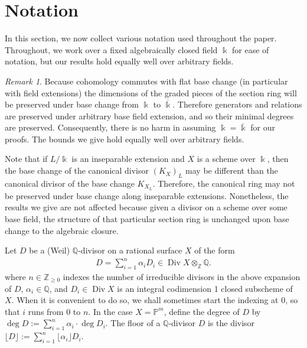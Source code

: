 \documentclass{amsart}
\theoremstyle{plain}
\theoremstyle{definition}
\theoremstyle{remark}
\newtheorem{rem}[thm]{Remark}
\numberwithin{equation}{section}
\newcommand\bq{{\mathbb Q}}
\newcommand\bp{{\mathbb P}}
\newcommand\bz{{\mathbb Z}}
\newcommand\bk{{\Bbbk}}
\DeclareMathOperator\di{Div}
\newcommand\invisiblesubsection{%
  \refstepcounter{subsection}%
}
\begin{document}
\section{Notation}
\label{section:notation}
\invisiblesubsection

In this section, we now collect various notation used throughout the paper.
Throughout,
we work over a fixed algebraically closed field $\bk$ for ease of notation,
but our results hold equally well over arbitrary fields.

\begin{rem}
\label{rem:algebraically-closed}
Because cohomology commutes with flat base change (in particular
with field extensions) the dimensions of the graded pieces of the
section ring will be preserved under base change from $\bk$ to
$\overline \bk$. Therefore generators and relations are preserved
under arbitrary base field extension, and so their minimal
degrees are preserved. Consequently, there is no harm in
assuming $\bk = \overline \bk$ for our proofs. The bounds we give
hold equally well over arbitrary fields.

Note that if $L/\bk$ is an inseparable extension
and $X$ is a scheme over $\bk$, then the base change of the
canonical divisor $(K_X)_L$ may be different than the canonical
divisor of the base change $K_{X_L}$.
Therefore, the canonical ring may not be preserved under base change
along inseparable extensions. Nonetheless, the results we give are
not affected because given a divisor on a scheme over some base field,
the structure of that particular section ring is unchanged upon
base change to the algebraic closure.
\end{rem}

Let $D$ be a (Weil) $\bq$-divisor on a rational surface $X$ of the form
\begin{align*}
	D = \sum_{i=1}^{n}\alpha_i D_i \in \di X \otimes_\bz \bq.
\end{align*}\noindent
where $n \in \bz_{\geq 0}$ indexes the number of irreducible divisors in 
the above expansion of $D$, $\alpha_i \in \bq$, and $D_i \in \di X$ is an integral
codimension 1 closed subscheme of $X$. When it is convenient to do
so, we shall sometimes start the indexing at $0$, so that $i$ runs
from $0$ to $n$. In the case $X = \bp^m$, define the degree of $D$ by $\deg D :=
\sum_{i=1}^{n}\alpha_i \cdot \deg D_i$. The floor of a $\bq$-divisor $D$ is the divisor
$\lfloor D \rfloor := \sum_{i = 1}^{n}
\lfloor \alpha_i \rfloor D_i$.
\end{document}
